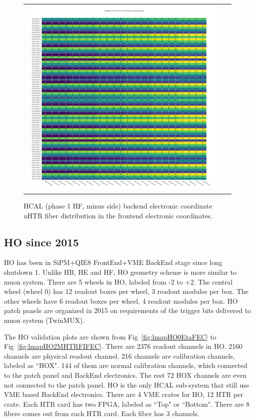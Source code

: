 \begin{figure}[htb]
 \begin{center}
  \begin{tabular}{cc}
   \includegraphics[angle=0,width=0.95\textwidth]{figures/appendix/ngHFM_uHTR_FI_in_FrontEnd.png}
  \end{tabular}
  \caption{HCAL (phase 1 HF, minus side) backend electronic coordinate uHTR fiber distribution in the frontend electronic coordinates.}
  \label{fig:lmapngHFMuHTRFIFEC}
 \end{center}
\end{figure}
\clearpage

\subsection{HO since 2015}
HO has been in SiPM+QIE8 FrontEnd+VME BackEnd stage since long shutdown 1. Unlike HB, HE and HF, HO geometry scheme is more similar to muon system. There are 5 wheels in HO, labeled from -2 to +2. The central wheel (wheel 0) has 12 readout boxes per wheel, 3 readout modules per box. The other wheels have 6 readout boxes per wheel, 4 readout modules per box. HO patch panels are organized in 2015 on requirements of the trigger bits delivered to muon system (TwinMUX). 

The HO validation plots are shown from Fig~\ref{fig:lmapHO0EtaFEC} to Fig~\ref{fig:lmapHO2MHTRFIFEC}. There are 2376 readout channels in HO. 2160 channels are physical readout channel. 216 channels are calibration channels, labeled as ``HOX". 144 of them are normal calibration channels, which connected to the patch panel and BackEnd electronics. The rest 72 HOX channels are even not connected to the patch panel. HO is the only HCAL sub-system that still use VME based BackEnd electronics. There are 4 VME crates for HO, 12 HTR per crate. Each HTR card has two FPGA, labeled as ``Top" or ``Bottom". There are 8 fibers comes out from each HTR card. Each fiber has 3 channels.
\clearpage

